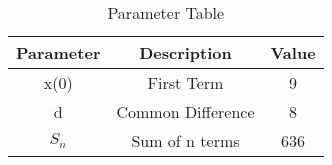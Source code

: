 
\begin{table}[ht]
  \centering
  \begin{tabular}{|c|c|c|}
    \hline
    Parameter & Description & Value \\
    \hline
     x(0) & First Term & 9\\
     \hline
     d & Common Difference & 8\\
    \hline
    $S_n$ & Sum of n terms & 636\\
    \hline
  \end{tabular}
  \vspace{2mm}
  \caption{Parameter Table}
\end{table}